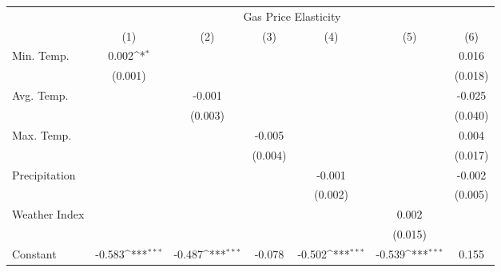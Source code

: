 {
\def\sym#1{\ifmmode^{#1}\else\(^{#1}\)\fi}
\begin{tabular}{l*{6}{c}}
\hline\hline
            &\multicolumn{6}{c}{Gas Price Elasticity}                                                                                           \\
            &\multicolumn{1}{c}{(1)}         &\multicolumn{1}{c}{(2)}         &\multicolumn{1}{c}{(3)}         &\multicolumn{1}{c}{(4)}         &\multicolumn{1}{c}{(5)}         &\multicolumn{1}{c}{(6)}         \\
\hline
Min. Temp.  &       0.002\sym{*}  &                     &                     &                     &                     &       0.016         \\
            &     (0.001)         &                     &                     &                     &                     &     (0.018)         \\
[1em]
Avg. Temp.  &                     &      -0.001         &                     &                     &                     &      -0.025         \\
            &                     &     (0.003)         &                     &                     &                     &     (0.040)         \\
[1em]
Max. Temp.  &                     &                     &      -0.005         &                     &                     &       0.004         \\
            &                     &                     &     (0.004)         &                     &                     &     (0.017)         \\
[1em]
Precipitation&                     &                     &                     &      -0.001         &                     &      -0.002         \\
            &                     &                     &                     &     (0.002)         &                     &     (0.005)         \\
[1em]
Weather Index&                     &                     &                     &                     &       0.002         &                     \\
            &                     &                     &                     &                     &     (0.015)         &                     \\
[1em]
Constant    &      -0.583\sym{***}&      -0.487\sym{***}&      -0.078         &      -0.502\sym{***}&      -0.539\sym{***}&       0.155         \\

\end{tabular}}
